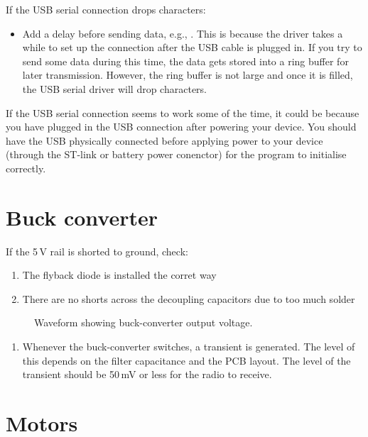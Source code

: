 If the USB serial connection drops characters:
 \begin{itemize}
 \item Add a delay before sending data, e.g., .
   This is because the driver takes a while to set up the connection
   after the USB cable is plugged in.  If you try to send some data
   during this time, the data gets stored into a ring buffer for later
   transmission.  However, the ring buffer is not large and once it is
   filled, the USB serial driver will drop characters.
 \end{itemize}

If the USB serial connection seems to work some of the time, it could
be because you have plugged in the USB connection after powering
your device. You should have the USB physically connected before
applying power to your device (through the ST-link or battery power
conenctor) for the program to initialise correctly.

 \section{Buck converter}
\label{buck-converter-testing}

If the 5\,V rail is shorted to ground, check:
\begin{enumerate}
\item The flyback diode is installed the corret way
\item There are no shorts across the decoupling capacitors due to too
  much solder
\end{enumerate}


\begin{figure}[!h]
  \centering
  \caption{Waveform showing buck-converter output voltage.}
\end{figure}


\begin{enumerate}
\item Whenever the buck-converter switches, a transient is generated.
  The level of this depends on the filter capacitance and the PCB
  layout.  The level of the transient should be 50\,mV or less for the
  radio to receive.

\end{enumerate}


\section{Motors}
\label{motors-testing}

